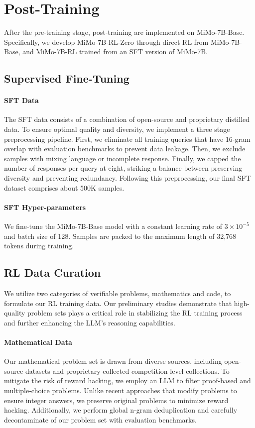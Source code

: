 \documentclass[11pt, a4paper, logo, copyright, nonumbering]{xiaomi}
\newcommand{\mimo}{MiMo-7B}
\newcommand{\mimobase}{MiMo-7B-Base}
\newcommand{\mimozero}{MiMo-7B-RL-Zero}
\newcommand{\mimorl}{MiMo-7B-RL}
\begin{document}
\section{Post-Training}
\label{sec:pt}


After the pre-training stage, post-training are implemented on \mimobase{}.
Specifically, we develop \mimozero{} through direct RL from \mimobase{}, and \mimorl{} trained from an SFT version of \mimo{}.


\subsection{Supervised Fine-Tuning}


\paragraph{SFT Data}

The SFT data consists of a combination of open-source and proprietary distilled data. To ensure optimal quality and diversity, we implement a three stage preprocessing pipeline.
First, we eliminate all training queries that have 16-gram overlap with evaluation benchmarks to prevent data leakage. 
Then, we exclude samples with mixing language or incomplete response.
Finally, we capped the number of responses per query at eight, striking a balance between preserving diversity and preventing redundancy.
Following this preprocessing, our final SFT dataset comprises about 500K samples.

\paragraph{SFT Hyper-parameters}

We fine-tune the \mimobase{} model with a constant learning rate of $3\times10^{-5}$ and batch size of 128. Samples are packed to the maximum length of 32,768 tokens during training.


\subsection{RL Data Curation}

We utilize two categories of verifiable problems, mathematics and code, to formulate our RL training data.
Our preliminary studies demonstrate that high-quality problem sets plays a critical role in stabilizing the RL training process and further enhancing the LLM's reasoning capabilities.


\paragraph{Mathematical Data}
Our mathematical problem set is drawn from diverse sources, including open-source datasets and proprietary collected competition-level collections.
To mitigate the risk of reward hacking, we employ an LLM to filter proof-based and multiple-choice problems.
Unlike recent approaches that modify problems to ensure integer answers, we preserve original problems to minimize reward hacking.
Additionally, we perform global n-gram deduplication and carefully decontaminate of our problem set with evaluation benchmarks.
\end{document}
